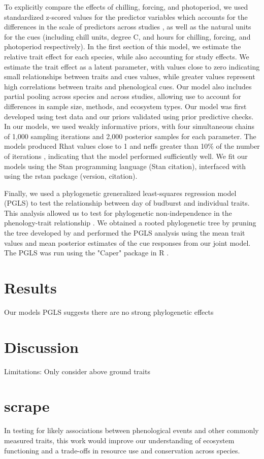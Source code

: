 \documentclass{article}\usepackage[]{graphicx}\usepackage[]{color}
\begin{document}
To explicitly compare the effects of chilling, forcing, and photoperiod, we used standardized z-scored values for the predictor variables which accounts for the differences in the scale of predictors across studies \citep{Gelman2006}, as well as the natural units for the cues (including chill units, degree C, and hours for chilling, forcing, and photoperiod respectively). In the first section of this model, we estimate the relative trait effect for each species, while also accounting for study effects. We estimate the trait effect as a latent parameter, with values close to zero indicating small relationships between traits and cues values, while greater values represent high correlations between traits and phenological cues. Our model also includes partial pooling across species and across studies, allowing use to account for differences in sample size, methods, and ecosystem types. Our model was first developed using test data and our priors validated using prior predictive checks. In our models, we used weakly informative priors, with four simultaneous chains of 1,000 sampling iterations and 2,000 posterior samples for each parameter. The models produced Rhat values close to 1 and neffs greater than 10\% of the number of iterations %
, indicating that the model performed sufficiently well.  We fit our models using the Stan programming language (Stan citation), interfaced with using the rstan package (version, citation).

Finally, we used a phylogenetic greneralized least-squares regression model (PGLS) to test the relationship between day of budburst and individual traits. This analysis allowed us to test for phylogenetic non-independence in the phenology-trait relationship \citep{Freckleton2002}. We obtained a rooted phylogenetic tree by pruning the tree developed by \citep{Smith2018} and performed the PGLS analysis using the mean trait values and mean posterior estimates of the cue responses from our joint model. The PGLS was run using the "Caper" package in R \citep{Orne2013}.

\section{Results}

Our models
PGLS suggests there are no strong phylogenetic effects

 \section{Discussion}


Limitations: Only consider above ground traits

\pagebreak
% 


\section{scrape}
In testing for likely associations between phenological events and other commonly measured traits, this work would improve our understanding of ecosystem functioning and a trade-offs in resource use and conservation across species.  
\end{document}
